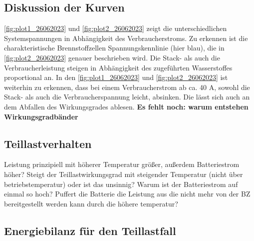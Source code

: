 \subsection{Diskussion der Kurven}
\autoref{fig:plot1_26062023} und \autoref{fig:plot2_26062023} zeigt die unterschiedlichen Systemspannungen in Abhängigkeit des
Verbraucherstroms. Zu erkennen ist die charakteristische Brennstoffzellen Spannungskennlinie (hier
blau), die in \autoref{fig:plot2_26062023} genauer beschrieben wird. Die Stack- als auch die Verbraucherleistung
steigen in Abhängigkeit des zugeführten Wasserstoffes proportional an. In den \autoref{fig:plot1_26062023} und \autoref{fig:plot2_26062023} ist weiterhin zu erkennen, dass bei einem Verbraucherstrom ab ca. 40 A, sowohl die Stack- als
auch die Verbraucherspannung leicht, absinken. Die lässt sich auch an dem Abfallen des
Wirkungsgrades ablesen. \textbf{Es fehlt noch: warum entstehen Wirkungsgradbänder}
\subsection{}
\subsection{Teillastverhalten}

Leistung prinzipiell mit höherer Temperatur größer, außerdem Batteriestrom höher? 
Steigt der Teillastwirkungsgrad mit steigender Temperatur (nicht über betriebstemperatur) oder ist das unsinnig?
Warum ist der Batteriestrom auf einmal so hoch? Puffert die Batterie die Leistung aus die nicht mehr von der BZ bereitgestellt werden kann durch die höhere temperatur?



\subsection{Energiebilanz für den Teillastfall}